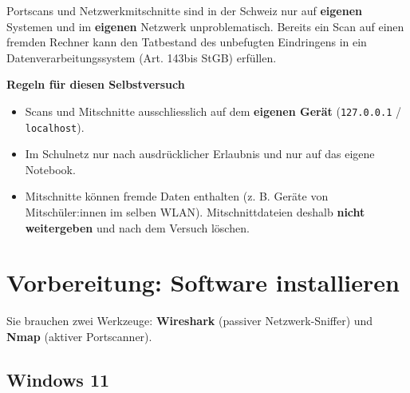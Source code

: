\documentclass[
  nswissgerman,
  a4paper,
  DIV=11,
  numbers=noendperiod,
  ngerman]{scrreprt}
\providecommand{\tightlist}{%
  \setlength{\itemsep}{0pt}\setlength{\parskip}{0pt}}
\begin{document}
Portscans und Netzwerkmitschnitte sind in der Schweiz nur auf
\textbf{eigenen} Systemen und im \textbf{eigenen} Netzwerk
unproblematisch. Bereits ein Scan auf einen fremden Rechner kann den
Tatbestand des unbefugten Eindringens in ein Datenverarbeitungssystem
(Art. 143bis StGB) erfüllen.

\textbf{Regeln für diesen Selbstversuch}

\begin{itemize}
\tightlist
\item
  Scans und Mitschnitte ausschliesslich auf dem \textbf{eigenen Gerät}
  (\texttt{127.0.0.1} / \texttt{localhost}).
\item
  Im Schulnetz nur nach ausdrücklicher Erlaubnis und nur auf das eigene
  Notebook.
\item
  Mitschnitte können fremde Daten enthalten (z. B. Geräte von
  Mitschüler:innen im selben WLAN). Mitschnittdateien deshalb
  \textbf{nicht weitergeben} und nach dem Versuch löschen.
\end{itemize}

\section{Vorbereitung: Software
installieren}\label{vorbereitung-software-installieren}

Sie brauchen zwei Werkzeuge: \textbf{Wireshark} (passiver
Netzwerk-Sniffer) und \textbf{Nmap} (aktiver Portscanner).

\subsection{Windows 11}\label{windows-11}
\end{document}
